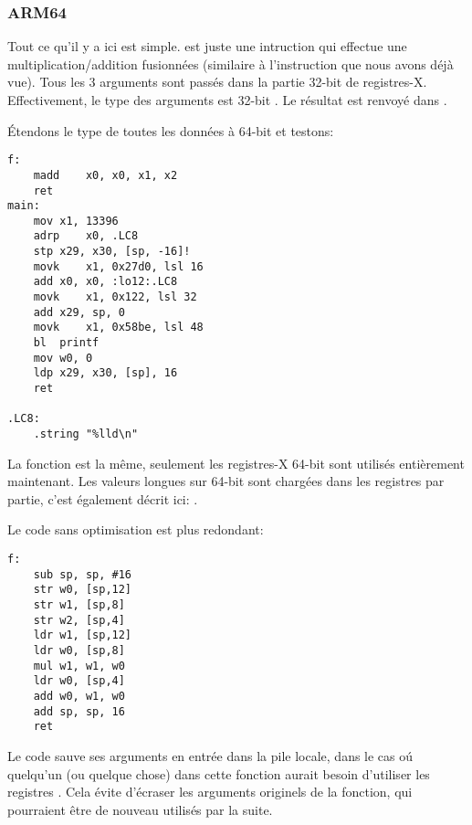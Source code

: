 \subsubsection{ARM64}


Tout ce qu'il y a ici est simple.
 est juste une intruction qui effectue une multiplication/addition fusionnées
(similaire à l'instruction  que nous avons déjà vue).
Tous les 3 arguments sont passés dans la partie 32-bit de registres-X.
Effectivement, le type des arguments est 32-bit .
Le résultat est renvoyé dans .



Étendons le type de toutes les données à 64-bit  et testons:



\begin{lstlisting}[style=customasmARM]
f:
	madd	x0, x0, x1, x2
	ret
main:
	mov	x1, 13396
	adrp	x0, .LC8
	stp	x29, x30, [sp, -16]!
	movk	x1, 0x27d0, lsl 16
	add	x0, x0, :lo12:.LC8
	movk	x1, 0x122, lsl 32
	add	x29, sp, 0
	movk	x1, 0x58be, lsl 48
	bl	printf
	mov	w0, 0
	ldp	x29, x30, [sp], 16
	ret

.LC8:
	.string	"%lld\n"
\end{lstlisting}

La fonction \ttf{} est la même, seulement les registres-X 64-bit sont utilisés entièrement
maintenant.
Les valeurs longues sur 64-bit sont chargées dans les registres par partie, c'est
également décrit ici: .


Le code sans optimisation est plus redondant:

\begin{lstlisting}[style=customasmARM]
f:
	sub	sp, sp, #16
	str	w0, [sp,12]
	str	w1, [sp,8]
	str	w2, [sp,4]
	ldr	w1, [sp,12]
	ldr	w0, [sp,8]
	mul	w1, w1, w0
	ldr	w0, [sp,4]
	add	w0, w1, w0
	add	sp, sp, 16
	ret
\end{lstlisting}

Le code sauve ses arguments en entrée dans la pile locale, dans le cas oú quelqu'un
(ou quelque chose) dans cette fonction aurait besoin d'utiliser les registres .
Cela évite d'écraser les arguments originels de la fonction, qui pourraient être
de nouveau utilisés par la suite.

